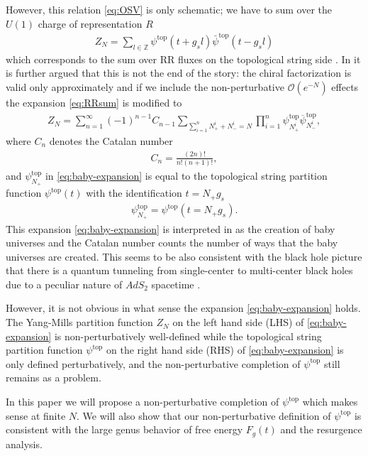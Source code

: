 \documentclass[11pt]{article}
\def\b#1{\overline{#1}}
\renewcommand{\[}{\begin{eqnarray}}
\renewcommand{\]}{\end{eqnarray}}
\begin{document}
However, this relation \eqref{eq:OSV} is only schematic;
we have to sum over the $U(1)$ charge of representation $R$
\begin{align}
 Z_N=\sum_{l\in\mathbb{Z}}\psi^{\text{top}}(t+g_sl)
\bar{\psi}^{\text{top}}(t-g_sl)
\label{eq:RRsum}
\end{align}
which corresponds to the sum over RR fluxes on the topological string side
\cite{Vafa:2004qa}.
In  \cite{Dijkgraaf:2005bp} it is further
argued that this is not the end of the story: 
the chiral factorization is valid only approximately 
and if we include the non-perturbative $\mathcal{O}(e^{-N})$ effects the expansion \eqref{eq:RRsum}
is modified to
\begin{align}
 Z_N=\sum_{n=1}^\infty (-1)^{n-1}C_{n-1}
\sum_{\sum_{i=1}^n N_+^i+N_-^i=N}\prod_{i=1}^n\psi^{\text{top}}_{N_+^i}
\b{\psi}^{\text{top}}_{N_-^i},
\label{eq:baby-expansion}
\end{align}
where 
$C_{n}$ denotes the Catalan number
\begin{align}
 C_n=\frac{(2n)!}{n!(n+1)!},
\end{align}
and $\psi_{N_+}^{\text{top}}$ in \eqref{eq:baby-expansion}
is equal to the topological string partition function $\psi^{\text{top}}(t)$
with the identification $t=N_+g_s$
\begin{align}
 \psi_{N_+}^{\text{top}}=\psi^{\text{top}}(t=N_+g_s).
\label{eq:psitop-N}
\end{align}
This expansion \eqref{eq:baby-expansion}
is interpreted in \cite{Dijkgraaf:2005bp}
as the creation of baby universes and the Catalan number counts the
number of ways that the baby universes are created. 
This seems to be also consistent with the black hole
picture that there is a quantum tunneling
from single-center to multi-center black holes \cite{Brill:1991rw}
due to a peculiar nature of $AdS_2$ spacetime \cite{Maldacena:1998uz,Sen:2011cn}.

However, it is not obvious in what sense the expansion \eqref{eq:baby-expansion} holds.
The Yang-Mills partition function $Z_N$ on the left hand side (LHS) of \eqref{eq:baby-expansion}
is non-perturbatively well-defined while the topological string partition function
$\psi^{\text{top}}$ on the right hand side (RHS) of \eqref{eq:baby-expansion}
is only defined perturbatively,
and the non-perturbative
completion of $\psi^{\text{top}}$ still remains as a problem.

In this paper we will propose a non-perturbative
completion of $\psi^{\text{top}}$
which makes sense at finite $N$. We will also show that our non-perturbative
definition of $\psi^{\text{top}}$ is consistent with the 
large genus behavior of free energy $F_g(t)$ and the resurgence analysis.
\end{document}
